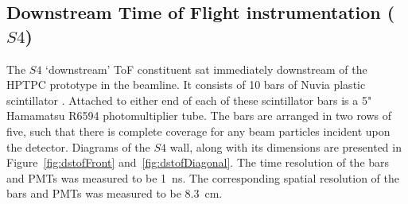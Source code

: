     

    



\subsection{Downstream Time of Flight instrumentation ($S4$)}
	
The $S4$ `downstream' ToF constituent sat immediately downstream of the HPTPC prototype in the beamline. It consists of 10 bars of Nuvia plastic scintillator \cite{NUVIA}. Attached to either end of each of these scintillator bars is a 5" Hamamatsu R6594 photomultiplier tube. The bars are arranged in two rows of five, such that there is complete coverage for any beam particles incident upon the detector. Diagrams of the $S4$ wall, along with its dimensions are presented in Figure~\ref{fig:dstofFront} and~\ref{fig:dstofDiagonal}. The time resolution of the bars and PMTs was measured to be 1~ns. The corresponding spatial resolution of the bars and PMTs was measured to be 8.3~cm.
    
